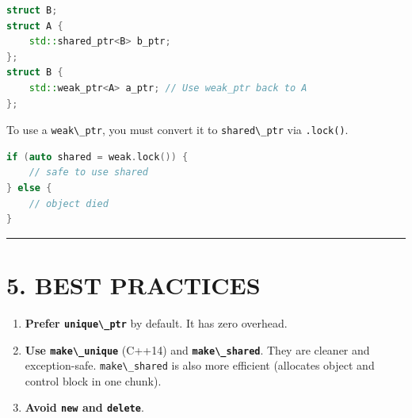 \begin{lstlisting}[language={C++}]
struct B;
struct A {
    std::shared_ptr<B> b_ptr;
};
struct B {
    std::weak_ptr<A> a_ptr; // Use weak_ptr back to A
};
\end{lstlisting}

To use a \passthrough{\lstinline!weak\_ptr!}, you must convert it to
\passthrough{\lstinline!shared\_ptr!} via
\passthrough{\lstinline!.lock()!}.

\begin{lstlisting}[language={C++}]
if (auto shared = weak.lock()) {
    // safe to use shared
} else {
    // object died
}
\end{lstlisting}

\begin{center}\rule{0.5\linewidth}{0.5pt}\end{center}

\hypertarget{best-practices}{%
\section{5. BEST PRACTICES}\label{best-practices}}

\begin{enumerate}
\def\labelenumi{\arabic{enumi}.}
\tightlist
\item
  \textbf{Prefer \passthrough{\lstinline!unique\_ptr!}} by default. It
  has zero overhead.
\item
  \textbf{Use \passthrough{\lstinline!make\_unique!}} (C++14) and
  \textbf{\passthrough{\lstinline!make\_shared!}}. They are cleaner and
  exception-safe. \passthrough{\lstinline!make\_shared!} is also more
  efficient (allocates object and control block in one chunk).
\item
  \textbf{Avoid \passthrough{\lstinline!new!} and
  \passthrough{\lstinline!delete!}}.
\end{enumerate}
